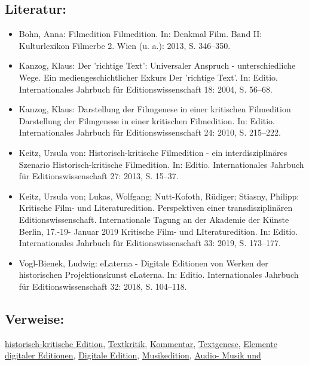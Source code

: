 \documentclass{article}
\begin{document}
        \subsection*{Literatur:}\begin{itemize}\item Bohn, Anna: Filmedition Filmedition. In: Denkmal Film. Band II: Kulturlexikon Filmerbe 2. Wien (u. a.): 2013, S. 346–350.\item Kanzog, Klaus: Der 'richtige Text': Universaler Anspruch -
                              unterschiedliche Wege. Ein mediengeschichtlicher Exkurs Der 'richtige Text'. In: Editio. Internationales Jahrbuch für
                              Editionswissenschaft 18: 2004, S. 56–68.\item Kanzog, Klaus: Darstellung der Filmgenese in einer kritischen
                              Filmedition Darstellung der Filmgenese in einer kritischen
                              Filmedition. In: Editio. Internationales Jahrbuch für
                              Editionswissenschaft 24: 2010, S. 215–222.\item Keitz, Ursula von: Historisch-kritische Filmedition - ein
                              interdisziplinäres Szenario Historisch-kritische Filmedition. In: Editio. Internationales Jahrbuch für
                              Editionswissenschaft 27: 2013, S. 15–37.\item Keitz, Ursula von; Lukas, Wolfgang; Nutt-Kofoth, Rüdiger; Stiasny, Philipp: Kritische Film- und Literaturedition. Perspektiven einer
                              transdisziplinären Editionswissenschaft. Internationale Tagung an der
                              Akademie der Künste Berlin, 17.-19- Januar 2019 Kritische Film- und LIteraturedition. In: Editio. Internationales Jahrbuch für
                              Editionswissenschaft 33: 2019, S. 173–177.\item Vogl-Bienek, Ludwig: eLaterna - Digitale Editionen von Werken der
                              historischen Projektionskunst eLaterna. In: Editio. Internationales Jahrbuch für
                              Editionswissenschaft 32: 2018, S. 104–118.\end{itemize}\subsection*{Verweise:}\href{https://gams.uni-graz.at/o:konde.93}{historisch-kritische Edition}, \href{https://gams.uni-graz.at/o:konde.192}{Textkritik}, \href{https://gams.uni-graz.at/o:konde.34}{Kommentar}, \href{https://gams.uni-graz.at/o:konde.28}{Textgenese}, \href{https://gams.uni-graz.at/o:konde.80}{Elemente digitaler Editionen}, \href{https://gams.uni-graz.at/o:konde.59}{Digitale Edition}, \href{https://gams.uni-graz.at/o:konde.139}{Musikedition}, \href{https://gams.uni-graz.at/o:konde.121}{Audio- Musik und
}
\end{document}

